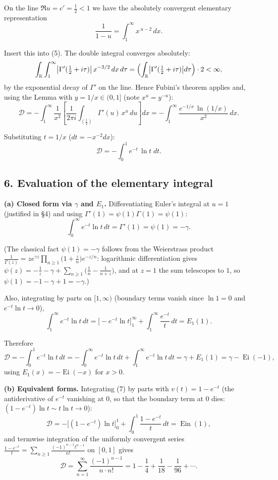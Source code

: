 \documentclass[11pt]{article}
\theoremstyle{remark}
\begin{document}
On the line $\Re u=c'=\tfrac12<1$ we have the absolutely convergent elementary representation
\[
\frac{1}{1-u}=\int_1^\infty x^{\,u-2}\,dx .
\]

Insert this into (5). The double integral converges absolutely:
\[
\int_{\mathbb R}\int_1^\infty\bigl|\Gamma'(\tfrac12+i\tau)\bigr|\,x^{-3/2}\,dx\,d\tau
=\Bigl(\int_{\mathbb R}\bigl|\Gamma'(\tfrac12+i\tau)\bigr|d\tau\Bigr)\cdot 2<\infty ,
\]
by the exponential decay of $\Gamma'$ on the line. Hence Fubini's theorem applies and, using the Lemma with $y=1/x\in(0,1]$ (note $x^{u}=y^{-u}$):
\[
\mathcal{D}
=-\int_1^\infty \frac{1}{x^{2}}\left[\frac{1}{2\pi i}\int_{(\frac12)}\Gamma'(u)\,x^{u}\,du\right]dx
=-\int_1^\infty \frac{e^{-1/x}\,\ln(1/x)}{x^{2}}\,dx .
\]

Substituting $t=1/x$ ($dt=-x^{-2}dx$):
\begin{equation*}
\mathcal{D}=-\int_0^1 e^{-t}\,\ln t\;dt . \tag{7}
\end{equation*}

\subsection*{6. Evaluation of the elementary integral}

\textbf{(a) Closed form via $\gamma$ and $E_1$.} Differentiating Euler's integral at $u=1$ (justified in \S4) and using $\Gamma'(1)=\psi(1)\Gamma(1)=\psi(1)$:
\[
\int_0^\infty e^{-t}\ln t\,dt=\Gamma'(1)=\psi(1)=-\gamma .
\]

(The classical fact $\psi(1)=-\gamma$ follows from the Weierstrass product $\frac1{\Gamma(z)}=ze^{\gamma z}\prod_{n\ge1}\bigl(1+\frac zn\bigr)e^{-z/n}$: logarithmic differentiation gives $\psi(z)=-\frac1z-\gamma+\sum_{n\ge1}\bigl(\frac1n-\frac1{n+z}\bigr)$, and at $z=1$ the sum telescopes to $1$, so $\psi(1)=-1-\gamma+1=-\gamma$.)

Also, integrating by parts on $[1,\infty)$ (boundary terms vanish since $\ln 1=0$ and $e^{-t}\ln t\to0$),
\[
\int_1^\infty e^{-t}\ln t\,dt=\bigl[-e^{-t}\ln t\bigr]_1^\infty+\int_1^\infty\frac{e^{-t}}{t}\,dt=E_1(1).
\]

Therefore
\[
\mathcal{D}=-\int_0^1 e^{-t}\ln t\,dt
=-\int_0^\infty e^{-t}\ln t\,dt+\int_1^\infty e^{-t}\ln t\,dt
=\gamma+E_1(1)=\gamma-\operatorname{Ei}(-1),
\]
using $E_1(x)=-\operatorname{Ei}(-x)$ for $x>0$.

\textbf{(b) Equivalent forms.} Integrating (7) by parts with $v(t)=1-e^{-t}$ (the antiderivative of $e^{-t}$ vanishing at $0$, so that the boundary term at $0$ dies: $(1-e^{-t})\ln t\sim t\ln t\to0$):
\[
\mathcal{D}=-\bigl[(1-e^{-t})\ln t\bigr]_0^1+\int_0^1\frac{1-e^{-t}}{t}\,dt=\operatorname{Ein}(1),
\]
and termwise integration of the uniformly convergent series $\frac{1-e^{-t}}{t}=\sum_{n\ge1}\frac{(-1)^{n-1}t^{n-1}}{n!}$ on $[0,1]$ gives
\[
\mathcal{D}=\sum_{n=1}^\infty\frac{(-1)^{n-1}}{n\cdot n!}
=1-\frac14+\frac1{18}-\frac1{96}+\cdots .
\]
\end{document}
